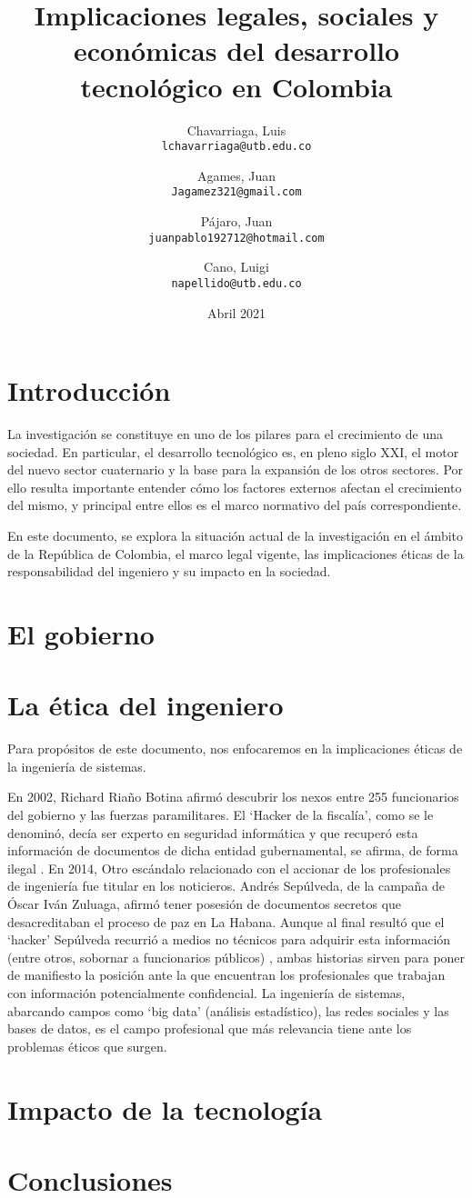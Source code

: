\documentclass[twocolumn]{article}
\author{
  Chavarriaga, Luis\\
  \texttt{lchavarriaga@utb.edu.co}
  \and
  Agames, Juan\\
  \texttt{Jagamez321@gmail.com}
  \and
  Pájaro, Juan\\
  \texttt{juanpablo192712@hotmail.com}
  \and
  Cano, Luigi\\
  \texttt{napellido@utb.edu.co}
}
\title{Implicaciones legales, sociales y económicas del desarrollo tecnológico
  en Colombia}
\date{Abril 2021}
\begin{document}
\maketitle

\section{Introducción}
La investigación se constituye en uno de los pilares para el crecimiento de una
sociedad. En particular, el desarrollo tecnológico es, en pleno siglo XXI, el
motor del nuevo sector cuaternario y la base para la expansión de los otros
sectores. Por ello resulta importante entender cómo los factores externos
afectan el crecimiento del mismo, y principal entre ellos es el marco normativo
del país correspondiente.

En este documento, se explora la situación actual de la investigación en el
ámbito de la República de Colombia, el marco legal vigente, las implicaciones
éticas de la responsabilidad del ingeniero y su impacto en la sociedad.

\section{El gobierno}

\section{La ética del ingeniero}

Para propósitos de este documento, nos enfocaremos en la implicaciones éticas de
la ingeniería de sistemas.

En 2002, Richard Riaño Botina afirmó descubrir los nexos entre 255 funcionarios
del gobierno y las fuerzas paramilitares. El `Hacker de la fiscalía', como se le
denominó, decía ser experto en seguridad informática y que recuperó esta
información de documentos de dicha entidad gubernamental, se afirma, de forma
ilegal \cite{noauthor_quien_2020}. En 2014, Otro escándalo relacionado con el
accionar de los profesionales de ingeniería fue titular en los noticieros.
Andrés Sepúlveda, de la campaña de Óscar Iván Zuluaga, afirmó tener posesión de
documentos secretos que desacreditaban el proceso de paz en La Habana. Aunque al
final resultó que el `hacker' Sepúlveda recurrió a medios no técnicos para
adquirir esta información (entre otros, sobornar a funcionarios públicos)
\cite{semanacom_andres_nodate}, ambas historias sirven para poner de manifiesto
la posición ante la que encuentran los profesionales que trabajan con
información potencialmente confidencial. La ingeniería de sistemas, abarcando
campos como `big data' (análisis estadístico), las redes sociales y las bases de
datos, es el campo profesional que más relevancia tiene ante los problemas
éticos que surgen.



\section{Impacto de la tecnología}

\section{Conclusiones}

\printbibliography{}
\end{document}

